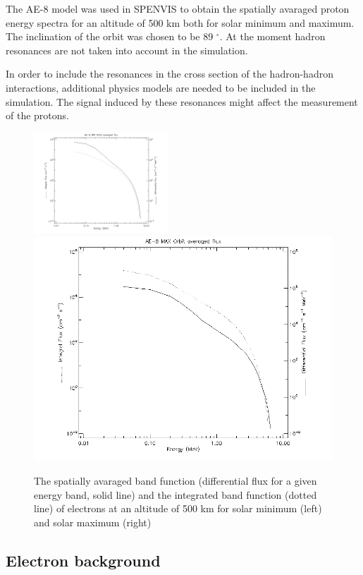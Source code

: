 \documentclass[12pt, a4paper,titlepage]{article}
\numberwithin{equation}{section}
\numberwithin{figure}{section}
\begin{document}
The AE-8 model was used in SPENVIS to obtain the spatially avaraged proton energy spectra for an altitude of 500 km both for solar minimum and maximum. The inclination of the orbit was chosen to be 89 $^{\circ}$. At the moment hadron resonances are not taken into account in the simulation.

In order to include the resonances in the cross section of the hadron-hadron interactions, additional physics models are needed to be included in the simulation. The signal induced by these resonances might affect the measurement of the protons.

\begin{figure}[htbp]
 \centering %
 \includegraphics[width=0.45\textwidth,origin=c,angle=0]{images/alt_500km_AE-8_MIN_averaged_spectra.png}
 \qquad
 \includegraphics[width=.45\textwidth,origin=c]{images/alt_500km_AE-8_MAX_averaged_spectra.png} 
 \caption{\label{fig:band500e} The spatially avaraged band function (differential flux for a given energy band, solid line) and the integrated band function (dotted line) of electrons at an altitude of 500 km for solar minimum (left) and solar maximum (right) }
 \end{figure}

\subsection{Electron background}
\end{document}
